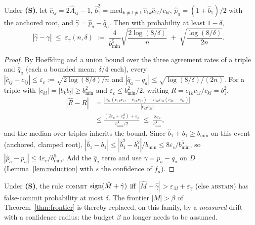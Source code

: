 \begin{theorem}\label{thm:gmeter}
Under \textnormal{\textbf{(S)}}, let $\hat c_{ij}=2\hat A_{ij}-1$,
$\hat b_1^2=\mathrm{med}_{k\ne l\ne 1}\,\hat c_{1k}\hat c_{1l}/\hat c_{kl}$,
$\hat p_a=(1+\hat b_1)/2$ with the anchored root, and
$\hat\gamma=\hat p_a-\hat q_a$. Then with probability at least $1-\delta$,
\[
|\hat\gamma-\gamma|\;\le\;\varepsilon_\gamma(n,\delta)
\;:=\;\frac{4}{b_{\min}^{5}}\sqrt{\frac{2\log(8/\delta)}{n}}
\;+\;\sqrt{\frac{\log(8/\delta)}{2n}} .
\]
\end{theorem}
\begin{proof}
By Hoeffding and a union bound over the three agreement rates of a triple and
$\hat q_a$ (each a bounded mean; $\delta/4$ each), every
$|\hat c_{ij}-c_{ij}|\le\varepsilon_c:=\sqrt{2\log(8/\delta)/n}$ and
$|\hat q_a-q_a|\le\sqrt{\log(8/\delta)/(2n)}$. For a triple with
$|c_{kl}|=|b_kb_l|\ge b_{\min}^2$ and $\varepsilon_c\le b_{\min}^2/2$, writing
$R=c_{1k}c_{1l}/c_{kl}=b_1^2$,
\[
\begin{aligned}
|\hat R-R|
&=\frac{|c_{kl}(\hat c_{1k}\hat c_{1l}-c_{1k}c_{1l})
        -c_{1k}c_{1l}(\hat c_{kl}-c_{kl})|}{|\hat c_{kl}c_{kl}|}\\[2pt]
&\le \frac{(2\varepsilon_c+\varepsilon_c^2)+\varepsilon_c}{b_{\min}^4/2}
\;\le\; \frac{8\varepsilon_c}{b_{\min}^4},
\end{aligned}
\]
and the median over triples inherits the bound. Since
$\hat b_1+b_1\ge b_{\min}$ on this event (anchored, clamped root),
$|\hat b_1-b_1|\le|\hat b_1^2-b_1^2|/b_{\min}\le 8\varepsilon_c/b_{\min}^5$,
so $|\hat p_a-p_a|\le 4\varepsilon_c/b_{\min}^5$. Add the $\hat q_a$ term and
use $\gamma=p_a-q_a$ on $D$ (Lemma~\ref{lem:reduction} with $s$ the
confidence of $f_a$).
\end{proof}

\begin{corollary}\label{cor:measured-frontier}
Under \textnormal{\textbf{(S)}}, the rule \textsc{commit}
$\operatorname{sign}(\hat M+\hat\gamma)$ iff $|\hat M+\hat\gamma|>
\varepsilon_M+\varepsilon_\gamma$ (else \textsc{abstain}) has false-commit
probability at most $\delta$. The frontier $|M|>\beta$ of
Theorem~\ref{thm:frontier} is thereby replaced, on this family, by a
\emph{measured} drift with a confidence radius: the budget $\beta$ no longer
needs to be assumed.
\end{corollary}


